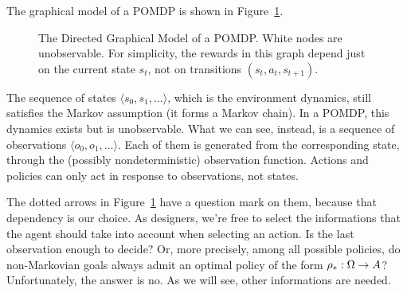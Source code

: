 The graphical model of a POMDP is shown in Figure~\ref{fig:pomdp}.
\begin{figure}

	\centering
	\caption{The Directed Graphical Model of a POMDP. White nodes are
	unobservable. For simplicity, the rewards in this graph depend just on the
	current state $s_t$, not on transitions ${(s_t, a_t, s_{t+1})}$.}
	\label{fig:pomdp}
\end{figure}
The sequence of states ${\langle s_0, s_1, \dots \rangle}$, which is the
environment dynamics, still satisfies the Markov assumption (it forms a Markov
chain). In a POMDP, this dynamics exists but is unobservable. What we can
see, instead, is a sequence of observations ${ \langle o_0, o_1, \dots
\rangle}$. Each of them is generated from the corresponding state, through the
(possibly nondeterministic) observation function. Actions and policies can
only act in response to observations, not states.

The dotted arrows in Figure~\ref{fig:pomdp} have a question mark on them,
because that dependency is our choice. As designers, we're free to select
the informations that the agent should take into account when selecting an
action. Is the last observation enough to decide? Or, more precisely, among
all possible policies, do non-Markovian goals always admit an optimal policy
of the form ${\rho}_*: \Omega \to A$? Unfortunately, the answer is no.
As we will see, other informations are needed.

